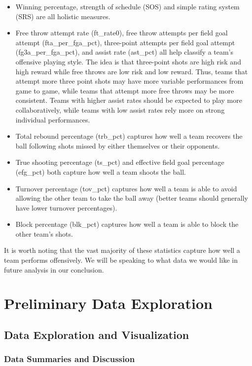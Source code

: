 \documentclass[10pt,a4paper, hidelinks]{article} %
\begin{document}
\begin{itemize}
	\item Winning percentage, strength of schedule (SOS) and simple rating system (SRS) are all holistic measures.
	\item Free throw attempt rate (ft\_rate0), free throw attempts per field goal attempt (fta\_per\_fga\_pct),  three-point attempts per field goal attempt (fg3a\_per\_fga\_pct), and assist rate (ast\_pct) all help classify a team's offensive playing style. The idea is that three-point shots are high risk and high reward while free throws are low risk and low reward. Thus, teams that attempt more three point shots may have more variable performances from game to game, while teams that attempt more free throws may be more consistent. Teams with higher assist rates should be expected to play more collaboratively, while teams with low assist rates rely more on strong individual performances.
	\item Total rebound percentage (trb\_pct) captures how well a team recovers the ball following shots missed by either themselves or their opponents.
	\item True shooting percentage (ts\_pct) and effective field goal percentage (efg\_pct) both capture how well a team shoots the ball.
	\item Turnover percentage (tov\_pct) captures how well a team is able to avoid allowing the other team to take the ball away (better teams should generally have lower turnover percentages).
	\item Block percentage (blk\_pct)  captures how well a team is able to block the other team's shots.
\end{itemize}

It is worth noting that the vast majority of these statistics capture how well a team performs offensively. We will be speaking to what data we would like in future analysis in our conclusion.

\section{Preliminary Data Exploration}

\subsection{Data Exploration and Visualization}

\subsubsection{Data Summaries and Discussion}
\end{document}
